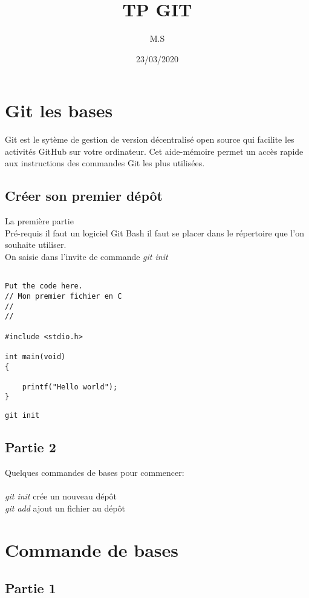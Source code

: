 \documentclass{article}
\title{TP GIT}
\author{M.S}
\date {23/03/2020}
\begin{document}
\maketitle{}
\section {Git les bases}


Git est le sytème de gestion de version décentralisé open source qui facilite les activités GitHub sur votre ordinateur.
Cet aide-mémoire permet un accès rapide aux instructions des commandes Git les plus utilisées.	

\subsection{Créer son premier dépôt}
La première partie
\\ 
Pré-requis il faut un logiciel Git Bash  
il faut se placer dans le répertoire que l'on souhaite utiliser. 
\\ 
On saisie dans l'invite de commande 
\textit{git init} 


\begin{lstlisting}[style=CStyle]

Put the code here. 
// Mon premier fichier en C 
// 
// 

#include <stdio.h>

int main(void)
{

	printf("Hello world");
}
\end{lstlisting}

\begin{lstlisting}[style=CStyle]
git init 
\end{lstlisting}


\subsection{Partie 2}

Quelques commandes de bases pour commencer: 
\\
\\
\textit{git init} crée un nouveau dépôt
\\ 
\textit{git add} ajout un fichier au dépôt

\section {Commande de bases}
\subsection{Partie 1}
\end{document}
